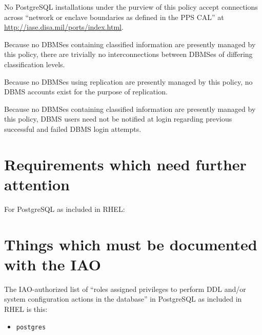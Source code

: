 %
No PostgreSQL installations under the purview of this policy accept
connections across ``network or enclave boundaries as defined in the PPS
CAL'' at \url{http://iase.disa.mil/ports/index.html}.

%
Because no DBMSes containing classified information are presently managed
by this policy, there are trivially no interconnections between DBMSes of
differing classification levels.

%
Because no DBMSes using replication are presently managed by this policy,
no DBMS accounts exist for the purpose of replication.

%
Because no DBMSes containing classified information are presently managed
by this policy, DBMS users need not be notified at login regarding
previous successful and failed DBMS login attempts.





\section{Requirements which need further attention}
\label{DatabaseFurtherAttention}

For PostgreSQL as included in RHEL:





\section{Things which must be documented with the IAO}
\label{DBDocumentedWithIAO}

%
The IAO-authorized list of ``roles assigned privileges to perform DDL
and/or system configuration actions in the database'' in PostgreSQL as
included in RHEL is this:

\begin{itemize}
\item \verb!postgres!
\end{itemize}

